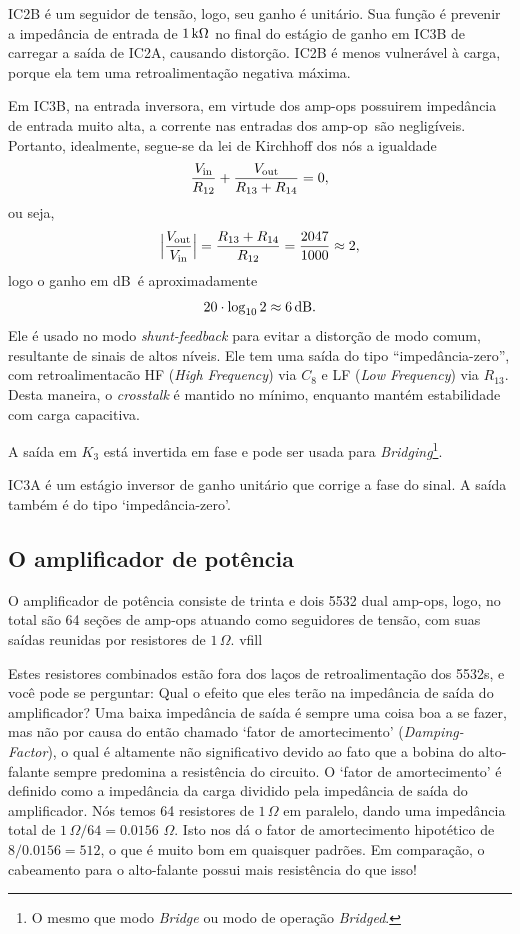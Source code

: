 \documentclass[12pt, a4paper, leqno, twoside]{book}
\def\ohm{\,\Omega}
\def\ampop{amp-op}
\def\db{{\rm dB}}
\def\[{\begin{equation}}
\def\]{\end{equation}}
\begin{document}
  IC2B \'e um seguidor de tens\~ao, logo, seu ganho \'e unit\'ario. Sua fun\c c\~ao \'e prevenir a imped\^ancia de entrada de $1\,{\rm k}\Omega$ no final do est\'agio de ganho em IC3B de carregar a sa\'ida de IC2A, causando distor\c c\~ao. IC2B \'e menos vulner\'avel \`a carga, porque ela tem uma retroalimenta\c c\~ao negativa m\'axima. 

  Em IC3B, na entrada inversora, em virtude dos \ampop{s} possuirem imped\^ancia de entrada muito alta, a corrente nas entradas dos \ampop\ s\~ao neglig\'iveis. Portanto, idealmente, segue-se da lei de Kirchhoff dos n\'os a igualdade
  \[
    {V_{\rm in}\over R_{12}}+{V_{\rm out}\over R_{13}+R_{14}}=0,
  \]
  ou seja,
  \[
    \Big|{V_{\rm out}\over V_{\rm in}}\Big|={R_{13}+R_{14}\over R_{12}}={2047\over 1000}\approx 2,
    \label{ganho_IC3B}
  \]
  logo o ganho em \db\ \'e aproximadamente
  \[
    20\cdot\log_{10}2\approx6\,\db. 
  \]
  Ele \'e usado no modo {\it shunt-feedback} para evitar a distor\c c\~ao de modo comum, resultante de sinais de altos n\'iveis. Ele tem uma sa\'ida do tipo ``imped\^ancia-zero'', com retroalimentac\~ao HF ({\it High Frequency}\/) via $C_8$ e LF ({\it Low Frequency}\/) via $R_{13}$. Desta maneira, o {\it crosstalk} \'e mantido no m\'inimo, enquanto mant\'em estabilidade com carga capacitiva.

  A sa\'ida em $K_3$ est\'a invertida em fase e pode ser usada para {\it Bridging}\footnote{O mesmo que modo {\it Bridge} ou modo de opera\c c\~ao {\it Bridged}.}.

  IC3A \'e um est\'agio inversor de ganho unit\'ario que corrige a fase do sinal. A sa\'ida tamb\'em \'e do tipo `imped\^ancia-zero'.

  \subsection{O amplificador de pot\^encia}

  O amplificador de pot\^encia consiste de trinta e dois 5532 dual \ampop{s}, logo, no total s\~ao 64 se\c c\~oes de \ampop{s} atuando como seguidores de tens\~ao, com suas sa\'idas reunidas por resistores de $1\ohm$. 
  vfill\null\eject


  Estes resistores combinados est\~ao fora dos la\c cos de retroalimenta\c c\~ao dos 5532s, e voc\^e pode se perguntar: Qual o efeito que eles ter\~ao na imped\^ancia de sa\'ida do amplificador? Uma baixa imped\^ancia de sa\'ida \'e sempre uma coisa boa a se fazer, mas n\~ao por causa do ent\~ao chamado `fator de amortecimento' ({\it Damping-Factor}\/), o qual \'e altamente n\~ao significativo devido ao fato que a bobina do alto-falante sempre predomina a resist\^encia do circuito. O `fator de amortecimento' \'e definido como a imped\^ancia da carga dividido pela imped\^ancia de sa\'ida do amplificador. N\'os temos 64 resistores de $1\ohm$ em paralelo, dando uma imped\^ancia total de $1\ohm/64=0.0156\,\ohm$. Isto nos d\'a o fator de amortecimento hipot\'etico de $8/0.0156=512$, o que \'e muito bom em quaisquer padr\~oes. Em compara\c c\~ao, o cabeamento para o alto-falante possui mais resist\^encia do que isso!
\end{document}
